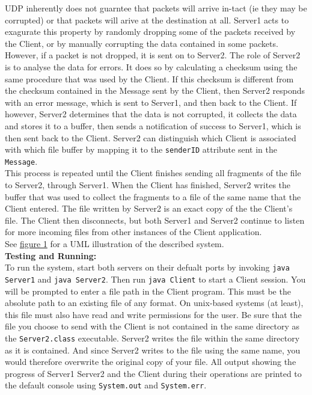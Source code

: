 \documentclass[12pt]{article}
\begin{document}
UDP inherently does not guarntee that packets will arrive
in-tact (ie they may be corrupted) or that packets will arive at the destination at all.
Server1 acts to exagurate this property by randomly dropping some of the packets received
by the Client, or by manually corrupting the data contained in some packets. However, if
a packet is not dropped, it is sent on to Server2. The role of Server2 is to analyse the
data for errors. It does so by calculating a checksum using the same procedure 
that was used by the Client. If this checksum is different from the checksum contained in
the Message sent by the Client, then Server2 responds with an error message, which is sent
to Server1, and then back to the Client. If however, Server2 determines that the data is
not corrupted, it collects the data and stores it to a buffer, then sends a notification
of success to Server1, which is then sent back to the Client. 
Server2 can distinguish which Client is associated with which file buffer by mapping it to the {\tt senderID} attribute sent in the {\tt Message}. \\

This process is repeated until the Client finishes sending all fragments of the file to
Server2, through Server1. When the Client has finished, Server2 writes the buffer that was used to
collect the fragments to a file of the same name that the Client entered. The file
written by Server2 is an exact copy of the the Client's file. The Client then
disconnects, but both Server1 and Server2 continue to listen for more incoming files from
other instances of the Client application. \\

See \underline{figure 1} for a UML illustration of the described system. \\

\noindent
{\bf Testing and Running:}
\vspace{2mm} \\
To run the system, start both servers on their defualt ports by invoking {\tt java
Server1} and {\tt java Server2}. Then run {\tt java Client} to start a Client session. 
You will be prompted to enter a file path in the Client program. This must be the absolute
path to an existing file of any format. On unix-based systems (at least), this file must also have
read and write permissions for the user. Be sure that the file you choose to send with the
Client is not contained in the same directory as the {\tt Server2.class} executable.
Server2 writes the file within the same directory as it is contained.
And since Server2 writes to the file using the same name, you would therefore overwrite the
original copy of your file. All output showing the progress of Server1 Server2 and
the Client during their operations are printed to the default console using {\tt System.out} and
{\tt System.err}. 
\vspace{5mm} \\
\end{document}
